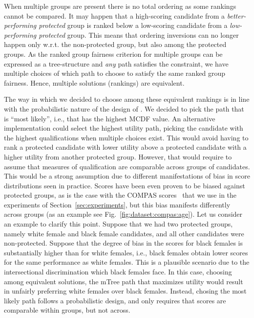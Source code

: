 When multiple groups are present there is no total ordering as some rankings cannot be compared.
%
It may happen that a high-scoring candidate from a \emph{better-performing protected} group is ranked below a low-scoring candidate from a \emph{low-performing protected} group.
%
This means that ordering inversions can no longer happen only w.r.t. the non-protected group, but also among the protected groups.
%
As the ranked group fairness criterion for multiple groups can be expressed as a tree-structure and \emph{any} path satisfies the constraint, we have multiple choices of which path to choose to satisfy the same ranked group fairness.
%
Hence, multiple solutions (rankings) are equivalent.
%

The way in which we decided to choose among these equivalent rankings is in line with the probabilistic nature of the design of \algoFAIR.
%
We decided to pick the path that is ``most likely'', i.e., that has the highest MCDF value.
%
An alternative implementation could select the highest utility path, picking the candidate with the highest qualifications when multiple choices exist.
%
This would avoid having to rank a protected candidate with lower utility above a protected candidate with a higher utility from another protected group.
%
However, that would require to assume that measures of qualification are comparable across groups of candidates.
%
This would be a strong assumption due to different manifestations of bias in score distributions seen in practice.
%
Scores have been even proven to be biased against protected groups, as is the case with the COMPAS scores~\cite{angwin_2016_machine} that we use in the experiments of Section~\ref{sec:experiments}, but this bias manifests differently across groups (as an example see Fig.~\ref{fig:dataset:compas:age}).
%
Let us consider an example to clarify this point.
%
Suppose that we had two protected groups, namely white female and black female candidates, and all other candidates were non-protected.
%
%
Suppose that the degree of bias in the scores for black females is substantially higher than for white females, i.e., black females obtain lower scores for the same performance as white females. This is a plausible scenario due to the intersectional discrimination which black females face.
%
In this case, choosing among equivalent solutions, the mTree path that maximizes utility would result in unfairly preferring white females over black females.
%
Instead, chosing the most likely path follows a probabilistic design, and only requires that scores are comparable within groups, but not across.
